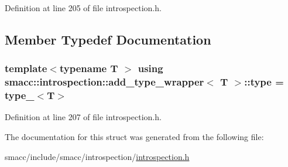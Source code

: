 Definition at line 205 of file introspection.\+h.



\subsection{Member Typedef Documentation}
\subsubsection[{\texorpdfstring{type}{type}}]{\setlength{\rightskip}{0pt plus 5cm}template$<$typename T $>$ using {\bf smacc\+::introspection\+::add\+\_\+type\+\_\+wrapper}$<$ T $>$\+::{\bf type} =  {\bf type\+\_\+}$<$T$>$}\hypertarget{structsmacc_1_1introspection_1_1add__type__wrapper_a4390a0426686e1e115d4c3ad22165cd9}{}\label{structsmacc_1_1introspection_1_1add__type__wrapper_a4390a0426686e1e115d4c3ad22165cd9}


Definition at line 207 of file introspection.\+h.



The documentation for this struct was generated from the following file\+:\begin{DoxyCompactItemize}
\item 
smacc/include/smacc/introspection/\hyperlink{introspection_8h}{introspection.\+h}\end{DoxyCompactItemize}
